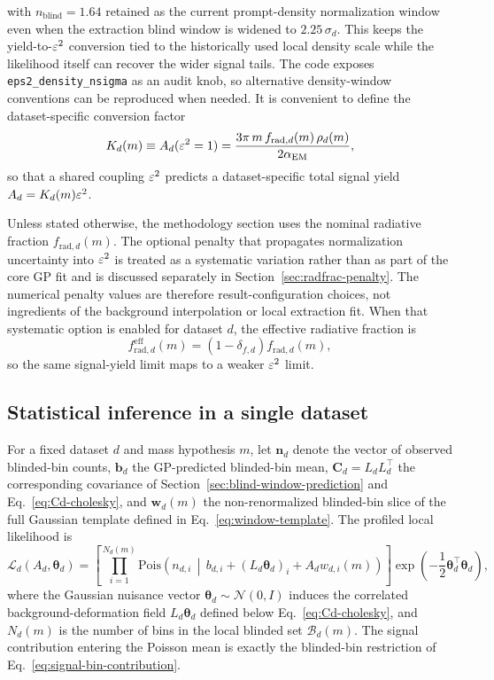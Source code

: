 with $n_{\mathrm{blind}}=1.64$ retained as the current prompt-density normalization
window even when the extraction blind window is widened to $2.25\,\sigma_d$. This keeps
the yield-to-$\varepsilon^2$ conversion tied to the historically used local density scale while
the likelihood itself can recover the wider signal tails. The code exposes
\texttt{eps2\_density\_nsigma} as an audit knob, so alternative density-window
conventions can be reproduced when needed. It is convenient to define the
dataset-specific conversion factor
\begin{equation}
K_d(m) \equiv A_d(\varepsilon^2 = 1)
= \frac{3\pi\,m\,f_{\mathrm{rad},d}(m)\,\rho_d(m)}{2\alpha_{\mathrm{EM}}},
\label{eq:Kd-conversion}
\end{equation}
so that a shared coupling $\varepsilon^2$ predicts a dataset-specific total signal yield
$A_d = K_d(m)\varepsilon^2$.

Unless stated otherwise, the methodology section uses the nominal radiative fraction
$f_{\mathrm{rad},d}(m)$. The optional penalty that propagates normalization uncertainty
into $\varepsilon^2$ is treated as a systematic variation rather than as part of the core GP
fit and is discussed separately in Section~\ref{sec:radfrac-penalty}. The numerical
penalty values are therefore result-configuration choices, not ingredients of the
background interpolation or local extraction fit. When that systematic option is
enabled for dataset $d$, the effective radiative fraction is
\begin{equation}
f_{\mathrm{rad},d}^{\mathrm{eff}}(m)
= \left(1-\delta_{f,d}\right) f_{\mathrm{rad},d}(m),
\end{equation}
so the same signal-yield limit maps to a weaker $\varepsilon^2$ limit.

\subsection{Statistical inference in a single dataset}

For a fixed dataset $d$ and mass hypothesis $m$, let $\bm{n}_d$ denote the vector of
observed blinded-bin counts, $\bm{b}_d$ the GP-predicted blinded-bin mean,
$\bm{C}_d=L_dL_d^\top$ the corresponding covariance of
Section~\ref{sec:blind-window-prediction} and Eq.~\eqref{eq:Cd-cholesky}, and
$\bm{w}_d(m)$ the
non-renormalized blinded-bin slice of the full Gaussian template defined in
Eq.~\eqref{eq:window-template}. The profiled local likelihood is
\begin{equation}
\mathcal{L}_d(A_d,\bm{\theta}_d)
=
\left[
\prod_{i=1}^{N_d(m)}
\mathrm{Pois}\!\left(
n_{d,i}\,\middle|\,
b_{d,i} + (L_d\bm{\theta}_d)_i + A_d w_{d,i}(m)
\right)
\right]
\exp\!\left(-\frac{1}{2}\bm{\theta}_d^\top\bm{\theta}_d\right),
\label{eq:singlelike}
\end{equation}
where the Gaussian nuisance vector $\bm{\theta}_d\sim\mathcal{N}(0,I)$ induces the
correlated background-deformation field $L_d\bm{\theta}_d$ defined below
Eq.~\eqref{eq:Cd-cholesky}, and $N_d(m)$ is the number of bins in the local blinded
set $\mathcal{B}_d(m)$. The signal contribution entering the Poisson mean is exactly
the blinded-bin restriction of Eq.~\eqref{eq:signal-bin-contribution}.

